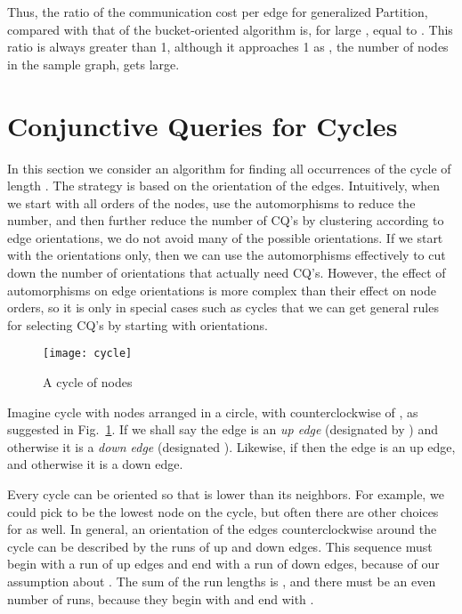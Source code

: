 Thus, the ratio of the communication cost per edge for generalized Partition, compared with that of the bucket-oriented algorithm is, for large , equal to .
This ratio is always greater than 1, although it approaches 1 as , the number of nodes in the sample graph, gets large.



\section{Conjunctive Queries for Cycles}
\label{cyc-sect}

In this section we consider an algorithm for finding all occurrences of the cycle  of length .  The strategy is based on the orientation of the edges.  Intuitively, when we start with all orders of the nodes, use the automorphisms to reduce the number, and then further reduce the number of CQ's by clustering according to edge orientations, we do not avoid many of the possible orientations.  If we start with the orientations only, then we can use the automorphisms effectively to cut down the number of orientations that actually need CQ's.  However, the effect of automorphisms on edge orientations is more complex than their effect on node orders, so it is only in special cases such as cycles that we can get general rules for selecting CQ's by starting with orientations.

\begin{figure}
\centerline{\texttt{[image: cycle]}}
\caption{A cycle of  nodes}
\label{cycle-fig}
\end{figure}

Imagine cycle  with nodes  arranged in a circle, with  counterclockwise of , as suggested in Fig.~\ref{cycle-fig}.
If  we shall say the edge  is an {\em up edge} (designated by ) and otherwise it is a {\em down edge} (designated ).  Likewise, if  then the edge  is an up edge, and otherwise it is a down edge.

Every cycle can be oriented so that  is lower than its neighbors.  For example, we could pick  to be the lowest node on the cycle, but often there are other choices for  as well.  In general, an orientation of the edges counterclockwise around the cycle can be described by the runs of up and down edges.  This sequence must begin with a run of up edges and end with a run of down edges, because of our assumption about .  The sum of the run lengths is , and there must be an even number of runs, because they begin with  and end with .

